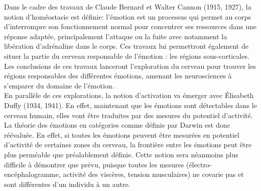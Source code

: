 Dans le cadre des travaux de Claude Bernard et Walter Cannon (1915, 1927), la notion d’homéostasie est définie: l'émotion est un processus qui permet au corps d'interrompre son fonctionnement normal pour concentrer ses ressources dans une réponse adaptée, principalement l'attaque ou la fuite avec notamment la libération d'adrénaline dans le corps. Ces travaux lui permettront également de situer la partie du cerveau responsable de l'émotion : les régions sous-corticales.
Les conclusions de ces travaux lanceront l'exploration du cerveau pour trouver les régions responsables des différentes émotions, amenant les neurosciences à s'emparer du domaine de l'émotion. \\
En parallèle de ces explorations, la notion d'activation va émerger avec Élisabeth Duffy (1934, 1941). En effet, maintenant que les émotions sont détectables dans le cerveau humain, elles vont être traduites par des mesures du potentiel d'activité. La théorie des émotions en catégories comme définie par Darwin est donc réévaluée. En effet, si toutes les émotions peuvent être mesurées en potentiel d'activité de certaines zones du cerveau, la frontière entre les émotions peut être plus perméable que préalablement définie.
Cette notion sera néanmoins plus difficile à démontrer que prévu, puisque toutes les mesures (électro-encéphalogramme, activité des viscères, tension musculaires) ne covarie pas et sont différentes d'un individu à un autre.
